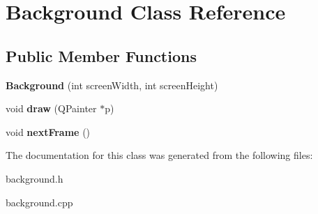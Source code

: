 \hypertarget{classBackground}{}\section{Background Class Reference}
\label{classBackground}
\subsection*{Public Member Functions}
\begin{DoxyCompactItemize}
\item 
\mbox{\label{classBackground_abfcf8bb350d3dc688b39138f55ace8bf}} 
{\bfseries Background} (int screen\+Width, int screen\+Height)
\item 
\mbox{\label{classBackground_a36c80fd1a1bfb7f4ffbf7514ae976bc6}} 
void {\bfseries draw} (Q\+Painter $\ast$p)
\item 
\mbox{\label{classBackground_aa0fc3036aaf578fc26f6e6a8032a2d27}} 
void {\bfseries next\+Frame} ()
\end{DoxyCompactItemize}


The documentation for this class was generated from the following files\+:\begin{DoxyCompactItemize}
\item 
background.\+h\item 
background.\+cpp\end{DoxyCompactItemize}
